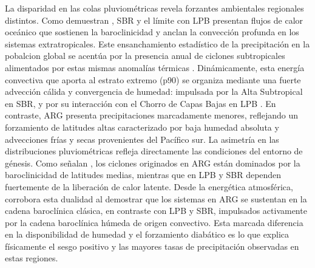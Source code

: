 La disparidad en las colas pluviométricas revela forzantes ambientales regionales distintos. Como demuestran \citet{russo2025impacts}, SBR y el límite con LPB presentan flujos de calor oceánico que sostienen la baroclinicidad y anclan la convección profunda en los sistemas extratropicales. Este ensanchamiento estadístico de la precipitación en la pobalcion global se acentúa por la presencia anual de ciclones subtropicales alimentados por estas mismas anomalías térmicas \citep{evans2012climatology}. Dinámicamente, esta energía convectiva que aporta al estrato extremo (p90) se organiza mediante una fuerte advección cálida y convergencia de humedad: impulsada por la Alta Subtropical en SBR, y por su interacción con el Chorro de Capas Bajas en LPB \citep{gramcianinov2024early}. En contraste, ARG presenta precipitaciones marcadamente menores, reflejando un forzamiento de latitudes altas caracterizado por baja humedad absoluta y advecciones frías y secas provenientes del Pacífico sur.
La asimetría en las distribuciones pluviométricas refleja directamente las condiciones del entorno de génesis. Como señalan \citet{gramcianinov2019properties}, los ciclones originados en ARG están dominados por la baroclinicidad de latitudes medias, mientras que en LPB y SBR dependen fuertemente de la liberación de calor latente. Desde la energética atmosférica, \citet{coutodesouza2024thesis} corrobora esta dualidad al demostrar que los sistemas en ARG se sustentan en la cadena baroclínica clásica, en contraste con LPB y SBR, impulsados activamente por la cadena baroclínica húmeda de origen convectivo. Esta marcada diferencia en la disponibilidad de humedad y el forzamiento diabático es lo que explica físicamente el sesgo positivo y las mayores tasas de precipitación observadas en estas regiones.
% 

